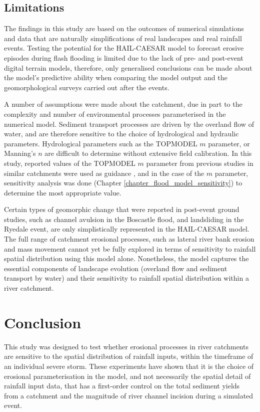 \subsection{Limitations}
The findings in this study are based on the outcomes of numerical simulations and data that are naturally simplifications of real landscapes and real rainfall events. Testing the potential for the HAIL-CAESAR model to forecast erosive episodes during flash flooding is limited due to the lack of pre- and post-event digital terrain models, therefore, only generalised conclusions can be made about the model's predictive ability when comparing the model output and the geomorphological surveys carried out after the events. 

A number of assumptions were made about the catchment, due in part to the complexity and number of environmental processes parameterised in the numerical model. Sediment transport processes are driven by the overland flow of water, and are therefore sensitive to the choice of hydrological and hydraulic parameters. Hydrological parameters such as the TOPMODEL \(m\) parameter, or Manning's \(n\) are difficult to determine without extensive field calibration. In this study, reported values of the TOPMODEL \(m\) parameter from previous studies in similar catchments were used as guidance \citep{beven1984testing,beven1997topmodel}, and in the case of the \(m\) parameter, sensitivity analysis was done (Chapter \ref{chapter_flood_model_sensitivity}) to determine the most appropriate value.   

Certain types of geomorphic change that were reported in post-event ground studies, such as channel avulsion in the Boscastle flood, and landsliding in the Ryedale event, are only simplistically represented in the HAIL-CAESAR model. The full range of catchment erosional processes, such as lateral river bank erosion and mass movement cannot yet be fully explored in terms of sensitivity to rainfall spatial distribution using this model alone. Nonetheless, the model captures the essential components of landscape evolution (overland flow and sediment transport by water) and their sensitivity to rainfall spatial distribution within a river catchment.


                       
\section{Conclusion}
This study was designed to test whether erosional processes in river catchments are sensitive to the spatial distribution of rainfall inputs, within the timeframe of an individual severe storm.
These experiments have shown that it is the choice of erosional parameterisation in the model, and not necessarily the spatial detail of rainfall input data, that has a first-order control on the total sediment yields from a catchment and the magnitude of river channel incision during a simulated event.

